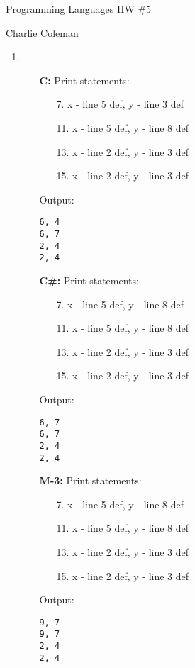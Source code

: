 \documentclass[12pt]{article}
\begin{document}
	\begin{center}
		\begin{large}Programming Languages HW \#5\end{large}
		
		\hfill Charlie Coleman
		
		\begin{enumerate}
			\item \begin{itemize}
				\item[\textbf{C:}] Print statements: \begin{enumerate}
					\item[7.] x - line 5 def, y - line 3 def
					\item[11.] x - line 5 def, y - line 8 def
					\item[13.] x - line 2 def, y - line 3 def
					\item[15.] x - line 2 def, y - line 3 def
				\end{enumerate}
				Output:
				\begin{lstlisting}
6, 4
6, 7
2, 4
2, 4
				\end{lstlisting}
				\item[\textbf{C\#:}] Print statements: \begin{itemize}
					\item[7.] x - line 5 def, y - line 8 def
					\item[11.] x - line 5 def, y - line 8 def
					\item[13.] x - line 2 def, y - line 3 def
					\item[15.] x - line 2 def, y - line 3 def
				\end{itemize}
				Output:
				\begin{lstlisting}
6, 7
6, 7
2, 4
2, 4
				\end{lstlisting}
				\item[\textbf{M-3:}] Print statements: \begin{enumerate}
					\item[7.] x - line 5 def, y - line 8 def
					\item[11.] x - line 5 def, y - line 8 def
					\item[13.] x - line 2 def, y - line 3 def
					\item[15.] x - line 2 def, y - line 3 def
				\end{enumerate}
				Output:
				\begin{lstlisting}
9, 7
9, 7
2, 4
2, 4
				\end{lstlisting}		 
			\end{itemize}

\end{enumerate}
\end{center}
\end{document}
